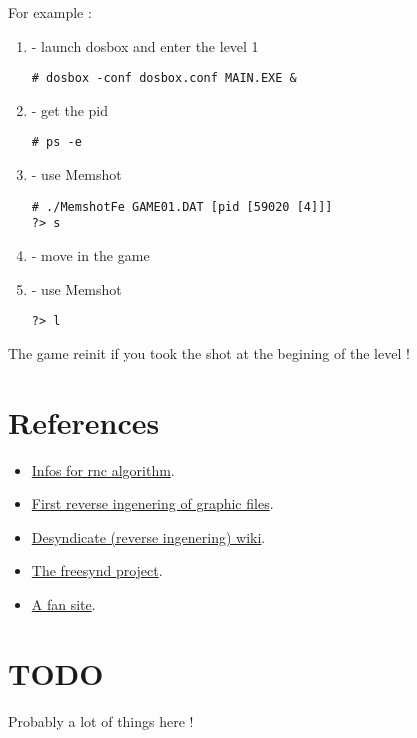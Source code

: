 \documentclass[a4paper,twoside,12pt,dvips]{article}
\begin{document}
For example :

\begin{enumerate}
\item - launch dosbox and enter the level 1
\begin{lstlisting}
# dosbox -conf dosbox.conf MAIN.EXE &
\end{lstlisting}
\item - get the pid 
\begin{lstlisting}
# ps -e
\end{lstlisting}
\item - use Memshot
\begin{lstlisting}
# ./MemshotFe GAME01.DAT [pid [59020 [4]]]
?> s
\end{lstlisting}
\item - move in the game
\item - use Memshot
\begin{lstlisting}
?> l
\end{lstlisting}
\end{enumerate}

The game reinit if you took the shot at the begining of the level !


\section{References}
\label{sec:references}

\begin{itemize}
\item \href{http://www.yoda.arachsys.com/dk/utils.html}{Infos for rnc algorithm}.
\item \href{http://citybuilder.sourceforge.net/}{First reverse ingenering of graphic files}.
\item \href{http://desyndicate.pbwiki.com/}{Desyndicate (reverse ingenering) wiki}.
\item \href{http://freesynd.sourceforge.net/about.php}{The freesynd project}.
\item \href{http://syndicate.lubie.org/siteinfo/contact.php}{A fan site}.
\end{itemize}

\section{TODO}
\label{sec:todo}

Probably a lot of things here !
\end{document}
